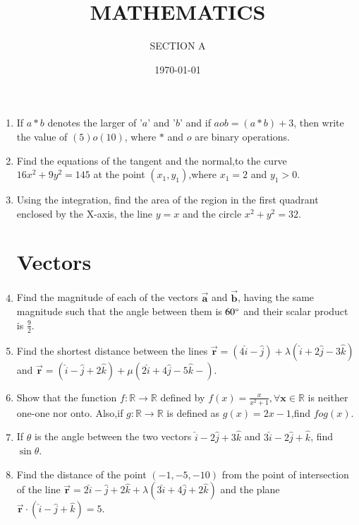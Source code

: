 \documentclass[10pt,-letter paper]{article}
\title{MATHEMATICS}
\author{SECTION A}
\date{\today}
\providecommand{\brak}[1]{\ensuremath{\left(#1\right)}}
\begin{document}
\maketitle

\begin{enumerate}
\section{Linear Forms}
	\item  If $a*b$ denotes the larger of '$a$' and '$b$' and if $a o b = \brak{a * b} + 3$, then write the value of $\brak{5} o \brak{10}$, where $*$ and $o$ are binary operations.
 \item Find the equations of the tangent and the normal,to the curve $16x^{2}+9y^{2}=145$ at the point $\brak{x_1,y_1}$,where $x_1=2$ and $y_1>0$.
 \item Using the integration, find the area of the region in the first quadrant enclosed by the X-axis, the line $y=x$ and the circle $x^{2}+y^{2}=32$.


 \section{Vectors}

	\item Find the magnitude of each of the vectors $\overrightarrow{\mathbf{a}}$ and $\overrightarrow{\mathbf{b}}$, having the same magnitude such that the angle between them is ${60\degree}$ and their scalar product is $\frac{9}{2}$.
 
 \item Find the shortest distance between the lines $\overrightarrow{\mathbf{r}}=\brak{4\hat{i}-\hat{j}}+\lambda\brak{\hat{i}+2\hat{j}-3\hat{k}}$ and $\overrightarrow{\mathbf{r}}=\brak{\hat{i}-\hat{j}+2\hat{k}}+\mu\brak{2\hat{i}+4\hat{j}-5\hat{k}-} $.

\item Show that the function $f:\mathbb{R}\rightarrow \mathbb{R}$ defined by $f\brak{x} = \frac{x}{x^{2}+1}, \forall \mathbf{x}\in \mathbb{R}$ is neither one-one nor onto. Also,if $g:\mathbb{R} \rightarrow \mathbb{R}$ is defined as $g\brak{x}=2x-1$,find $fog\brak{x}$.

\item If $\theta$ is the angle between the two vectors $\hat{i}-2\hat{j}+3\hat{k}$ and $3\hat{i}-2\hat{j}+\hat{k}$, find $\sin\theta$.

\item  Find the distance of the point \brak{-1,-5,-10} from the point of intersection of the line $\overrightarrow{\mathbf{r}}=2\hat{i}-\hat{j}+2\hat{k} + \lambda\brak{3\hat{i}+4\hat{j}+2\hat{k}}$ and the plane $\overrightarrow{\mathbf{r}}\cdot\brak{\hat{i}-\hat{j}+\hat{k}}=5$.


\end{enumerate}
\end{document}
